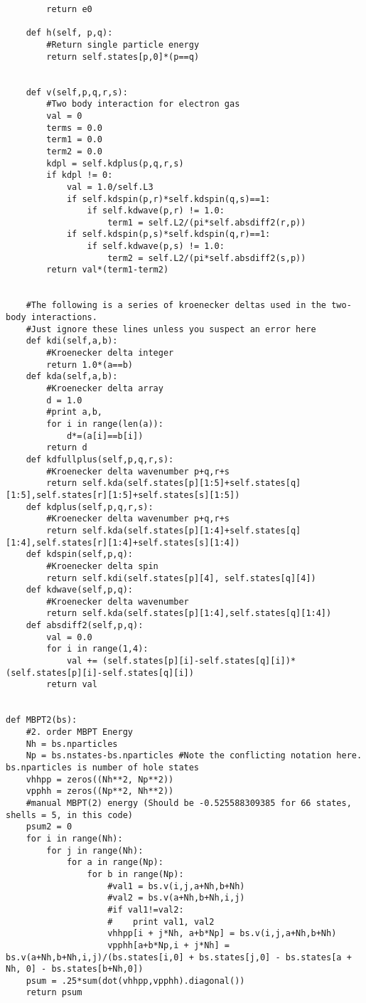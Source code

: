 \documentclass[%
oneside,                 %
final,                   %
10pt]{article}
\newenvironment{doconceexercise}{}{}
\begin{document}
\begin{doconceexercise}
\begin{verbatim}
        return e0
                
    def h(self, p,q):
        #Return single particle energy
        return self.states[p,0]*(p==q)

    
    def v(self,p,q,r,s):
        #Two body interaction for electron gas
        val = 0
        terms = 0.0
        term1 = 0.0
        term2 = 0.0
        kdpl = self.kdplus(p,q,r,s)
        if kdpl != 0:
            val = 1.0/self.L3
            if self.kdspin(p,r)*self.kdspin(q,s)==1:
                if self.kdwave(p,r) != 1.0:
                    term1 = self.L2/(pi*self.absdiff2(r,p))
            if self.kdspin(p,s)*self.kdspin(q,r)==1:
                if self.kdwave(p,s) != 1.0:
                    term2 = self.L2/(pi*self.absdiff2(s,p))
        return val*(term1-term2)

    
    #The following is a series of kroenecker deltas used in the two-body interactions. 
    #Just ignore these lines unless you suspect an error here
    def kdi(self,a,b):
        #Kroenecker delta integer
        return 1.0*(a==b)
    def kda(self,a,b):
        #Kroenecker delta array
        d = 1.0
        #print a,b,
        for i in range(len(a)):
            d*=(a[i]==b[i])
        return d
    def kdfullplus(self,p,q,r,s):
        #Kroenecker delta wavenumber p+q,r+s
        return self.kda(self.states[p][1:5]+self.states[q][1:5],self.states[r][1:5]+self.states[s][1:5])
    def kdplus(self,p,q,r,s):
        #Kroenecker delta wavenumber p+q,r+s
        return self.kda(self.states[p][1:4]+self.states[q][1:4],self.states[r][1:4]+self.states[s][1:4])
    def kdspin(self,p,q):
        #Kroenecker delta spin
        return self.kdi(self.states[p][4], self.states[q][4])
    def kdwave(self,p,q):
        #Kroenecker delta wavenumber
        return self.kda(self.states[p][1:4],self.states[q][1:4])
    def absdiff2(self,p,q):
        val = 0.0
        for i in range(1,4):
            val += (self.states[p][i]-self.states[q][i])*(self.states[p][i]-self.states[q][i])
        return val

        
def MBPT2(bs):
    #2. order MBPT Energy 
    Nh = bs.nparticles
    Np = bs.nstates-bs.nparticles #Note the conflicting notation here. bs.nparticles is number of hole states 
    vhhpp = zeros((Nh**2, Np**2))
    vpphh = zeros((Np**2, Nh**2))
    #manual MBPT(2) energy (Should be -0.525588309385 for 66 states, shells = 5, in this code)
    psum2 = 0
    for i in range(Nh):
        for j in range(Nh):
            for a in range(Np):
                for b in range(Np):
                    #val1 = bs.v(i,j,a+Nh,b+Nh)
                    #val2 = bs.v(a+Nh,b+Nh,i,j)
                    #if val1!=val2:
                    #    print val1, val2
                    vhhpp[i + j*Nh, a+b*Np] = bs.v(i,j,a+Nh,b+Nh)
                    vpphh[a+b*Np,i + j*Nh] = bs.v(a+Nh,b+Nh,i,j)/(bs.states[i,0] + bs.states[j,0] - bs.states[a + Nh, 0] - bs.states[b+Nh,0])
    psum = .25*sum(dot(vhhpp,vpphh).diagonal())
    return psum
    

\end{verbatim}
\end{doconceexercise}
\end{document}
